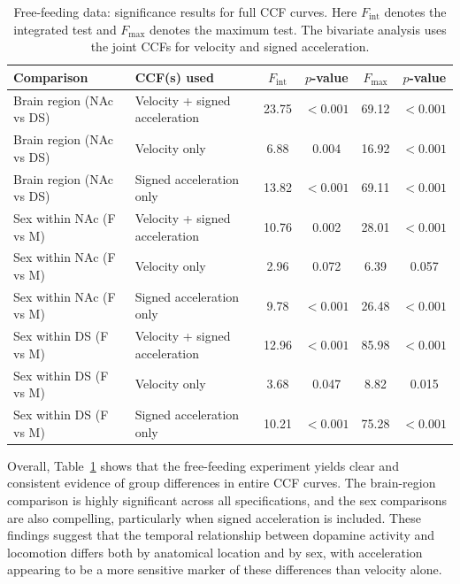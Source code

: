 \documentclass[12pt]{article}
\begin{document}
\begin{table}[ht]
\centering
\caption{Free-feeding data: significance results for full CCF curves. Here \(F_{\mathrm{int}}\) denotes the integrated test and \(F_{\max}\) denotes the maximum test. The bivariate analysis uses the joint CCFs for velocity and signed acceleration.}
\label{tab:freefeeding_full}
\begin{tabular}{llcccc}
\hline
Comparison & CCF(s) used & \(F_{\mathrm{int}}\) & \(p\)-value & \(F_{\max}\) & \(p\)-value \\
\hline
Brain region (NAc vs DS) & Velocity + signed acceleration & 23.75 & \(<0.001\) & 69.12 & \(<0.001\) \\
Brain region (NAc vs DS) & Velocity only & 6.88 & 0.004 & 16.92 & \(<0.001\) \\
Brain region (NAc vs DS) & Signed acceleration only & 13.82 & \(<0.001\) & 69.11 & \(<0.001\) \\
\hline
Sex within NAc (F vs M) & Velocity + signed acceleration & 10.76 & 0.002 & 28.01 & \(<0.001\) \\
Sex within NAc (F vs M) & Velocity only & 2.96 & 0.072 & 6.39 & 0.057 \\
Sex within NAc (F vs M) & Signed acceleration only & 9.78 & \(<0.001\) & 26.48 & \(<0.001\) \\
\hline
Sex within DS (F vs M) & Velocity + signed acceleration & 12.96 & \(<0.001\) & 85.98 & \(<0.001\) \\
Sex within DS (F vs M) & Velocity only & 3.68 & 0.047 & 8.82 & 0.015 \\
Sex within DS (F vs M) & Signed acceleration only & 10.21 & \(<0.001\) & 75.28 & \(<0.001\) \\
\hline
\end{tabular}
\end{table}

Overall, Table~\ref{tab:freefeeding_full} shows that the free-feeding experiment yields clear and consistent evidence of group differences in entire CCF curves. The brain-region comparison is highly significant across all specifications, and the sex comparisons are also compelling, particularly when signed acceleration is included. These findings suggest that the temporal relationship between dopamine activity and locomotion differs both by anatomical location and by sex, with acceleration appearing to be a more sensitive marker of these differences than velocity alone.
\end{document}
